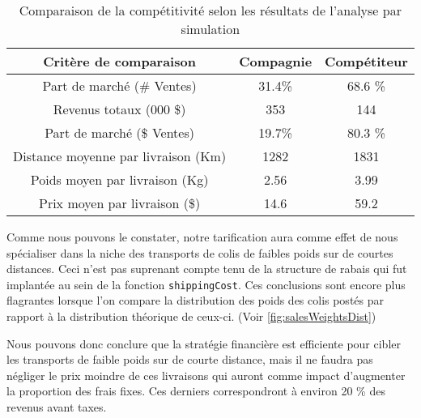 \begin{table}
	\begin{tabular}{ccc}
		\textbf{Critère de comparaison} & \textbf{Compagnie} & \textbf{Compétiteur} \\
		\hline
		Part de marché (\# Ventes) & 31.4\% & 68.6 \% \\
		Revenus totaux (000 \$) & 353 & 144 \\
		Part de marché (\$ Ventes) & 19.7\% & 80.3 \% \\
		Distance moyenne par livraison (Km) & 1282 & 1831 \\
		Poids moyen par livraison (Kg) & 2.56 & 3.99 \\
		Prix moyen par livraison (\$) & 14.6 & 59.2
	\end{tabular}
	\caption{Comparaison de la compétitivité selon les résultats de l'analyse par simulation}
	\label{tab:resultsComp}
\end{table}

Comme nous pouvons le constater, notre tarification aura comme effet de nous spécialiser dans la niche des transports de colis de faibles poids sur de courtes distances. Ceci n'est pas suprenant compte tenu de la structure de rabais qui fut implantée au sein de la fonction \texttt{shippingCost}. Ces conclusions sont encore plus flagrantes lorsque l'on compare la distribution des poids des colis postés par rapport à la distribution théorique de ceux-ci. (Voir \autoref{fig:salesWeightsDist}) \\


Nous pouvons donc conclure que la stratégie financière est efficiente pour cibler les transports de faible poids sur de courte distance, mais il ne faudra pas négliger le prix moindre de ces livraisons qui auront comme impact d'augmenter la proportion des frais fixes. Ces derniers correspondront à environ 20 \% des revenus avant taxes.
